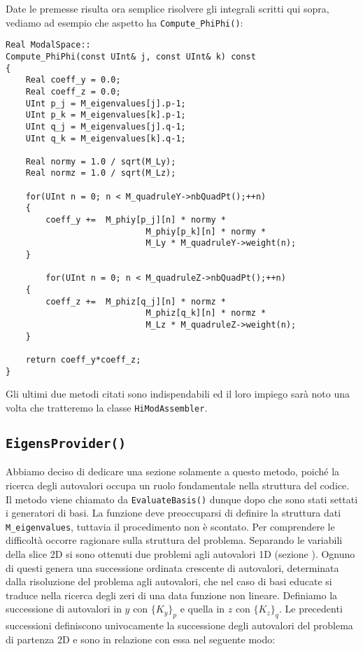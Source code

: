 Date le premesse risulta ora semplice risolvere gli integrali scritti qui sopra, vediamo ad esempio che aspetto ha \texttt{Compute\_PhiPhi()}:


\begin{lstlisting}[style = general]
Real ModalSpace::
Compute_PhiPhi(const UInt& j, const UInt& k) const
{
	Real coeff_y = 0.0;
	Real coeff_z = 0.0;
	UInt p_j = M_eigenvalues[j].p-1;
	UInt p_k = M_eigenvalues[k].p-1;
	UInt q_j = M_eigenvalues[j].q-1;
	UInt q_k = M_eigenvalues[k].q-1;
	
	Real normy = 1.0 / sqrt(M_Ly);
	Real normz = 1.0 / sqrt(M_Lz);
	
	for(UInt n = 0; n < M_quadruleY->nbQuadPt();++n)
	{
		coeff_y +=	M_phiy[p_j][n] * normy *	
							M_phiy[p_k][n] * normy *
							M_Ly * M_quadruleY->weight(n);
	}
	
		for(UInt n = 0; n < M_quadruleZ->nbQuadPt();++n)
	{
		coeff_z +=	M_phiz[q_j][n] * normz *	
							M_phiz[q_k][n] * normz *
							M_Lz * M_quadruleZ->weight(n);
	}
	
	return coeff_y*coeff_z;
}
\end{lstlisting}
 
 Gli ultimi due metodi citati sono indispendabili ed il loro impiego sar\`a noto una volta che tratteremo la classe \texttt{HiModAssembler}.
 
 \subsection{\texttt{EigensProvider()}}
 Abbiamo deciso di dedicare una sezione solamente a questo metodo, poich\'e la ricerca degli autovalori occupa un ruolo fondamentale nella struttura del codice.
 Il metodo viene chiamato da \texttt{EvaluateBasis()} dunque dopo che sono stati settati i generatori di basi. La funzione deve preoccuparsi di definire la struttura dati \texttt{M\_eigenvalues}, tuttavia il procedimento non \`e scontato. 
 Per comprendere le difficolt\`a occorre ragionare sulla struttura del problema. Separando le variabili della slice 2D si sono ottenuti due problemi agli autovalori 1D (sezione ). Ognuno di questi genera una successione ordinata crescente di autovalori, determinata dalla risoluzione del problema agli autovalori, che nel caso di basi educate si traduce nella ricerca degli zeri di una data funzione non lineare. Definiamo la successione di autovalori in $y$ con $\{K_y\}_p$ e quella in $z$ con $\{K_z\}_q$. Le precedenti successioni definiscono univocamente la successione degli autovalori del problema di partenza 2D e sono in relazione con essa nel seguente modo:

